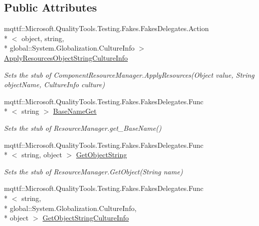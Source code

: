\subsection*{Public Attributes}
\begin{DoxyCompactItemize}
\item 
mqttf\-::\-Microsoft.\-Quality\-Tools.\-Testing.\-Fakes.\-Fakes\-Delegates.\-Action\\*
$<$ object, string, \\*
global\-::\-System.\-Globalization.\-Culture\-Info $>$ \hyperlink{class_system_1_1_component_model_1_1_fakes_1_1_stub_component_resource_manager_a4ac1fdceabae7521db7d290d179179f0}{Apply\-Resources\-Object\-String\-Culture\-Info}
\begin{DoxyCompactList}\small\item\em Sets the stub of Component\-Resource\-Manager.\-Apply\-Resources(\-Object value, String object\-Name, Culture\-Info culture)\end{DoxyCompactList}\item 
mqttf\-::\-Microsoft.\-Quality\-Tools.\-Testing.\-Fakes.\-Fakes\-Delegates.\-Func\\*
$<$ string $>$ \hyperlink{class_system_1_1_component_model_1_1_fakes_1_1_stub_component_resource_manager_adadd925e4975ff61dcbb8303c2f97b19}{Base\-Name\-Get}
\begin{DoxyCompactList}\small\item\em Sets the stub of Resource\-Manager.\-get\-\_\-\-Base\-Name()\end{DoxyCompactList}\item 
mqttf\-::\-Microsoft.\-Quality\-Tools.\-Testing.\-Fakes.\-Fakes\-Delegates.\-Func\\*
$<$ string, object $>$ \hyperlink{class_system_1_1_component_model_1_1_fakes_1_1_stub_component_resource_manager_a88308081599e7acc6c3c28cbb642d911}{Get\-Object\-String}
\begin{DoxyCompactList}\small\item\em Sets the stub of Resource\-Manager.\-Get\-Object(\-String name)\end{DoxyCompactList}\item 
mqttf\-::\-Microsoft.\-Quality\-Tools.\-Testing.\-Fakes.\-Fakes\-Delegates.\-Func\\*
$<$ string, \\*
global\-::\-System.\-Globalization.\-Culture\-Info, \\*
object $>$ \hyperlink{class_system_1_1_component_model_1_1_fakes_1_1_stub_component_resource_manager_ab7d9ffb5fdc3a9412acfeab9447aa485}{Get\-Object\-String\-Culture\-Info}

\end{DoxyCompactItemize}
